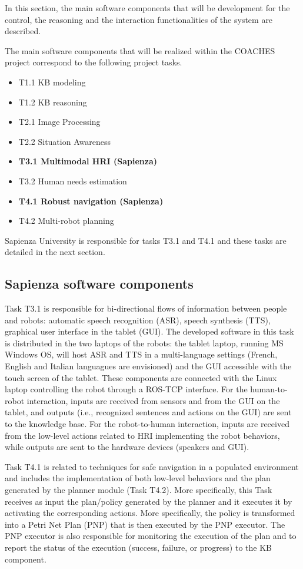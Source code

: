 \documentclass{article}
\begin{document}
In this section, the main software components that will be development for the control, the reasoning and the interaction functionalities of the system are described.

The main software components that will be realized within the COACHES project correspond to the following project tasks.
\begin{itemize}
\item T1.1 KB modeling
\item T1.2 KB reasoning
\item T2.1 Image Processing
\item T2.2 Situation Awareness
\item {\bf T3.1 Multimodal HRI (Sapienza)}
\item T3.2 Human needs estimation
\item {\bf T4.1 Robust navigation (Sapienza)}
\item T4.2 Multi-robot planning
\end{itemize}

Sapienza University is responsible for tasks T3.1 and T4.1 and these tasks are detailed in the next section.

\subsection{Sapienza software components}


Task T3.1 is responsible for bi-directional flows of information between people and robots: automatic speech recognition (ASR), speech synthesis (TTS), graphical user interface in the tablet (GUI). The developed software in this task is distributed in the two laptops of the robots: the tablet laptop, running MS Windows OS, will host ASR and TTS in a multi-language settings (French, English and Italian languagues are envisioned) and the GUI accessible with the touch screen of the tablet. These components are connected with the Linux laptop controlling the robot through a ROS-TCP interface. 
For the human-to-robot interaction, inputs are received from sensors and from the GUI on the tablet, and outputs (i.e., recognized sentences and actions on the GUI) are sent to the knowledge base. 
For the robot-to-human interaction, inputs are received from the low-level actions related to HRI implementing the robot behaviors, while outputs are sent to the hardware devices (speakers and GUI).


Task T4.1 is related to techniques for safe navigation in a populated environment and includes the implementation of both low-level behaviors and the plan generated by the planner module (Task T4.2). 
More specifically, this Task receives as input the plan/policy generated by the planner and it executes it by activating the corresponding actions. More specifically, the policy is transformed  into a Petri Net Plan (PNP) that is then executed by the PNP executor. The PNP executor is also responsible for monitoring the execution of the plan and to report the status of the execution (success, failure, or progress) to the KB component.
\end{document}
